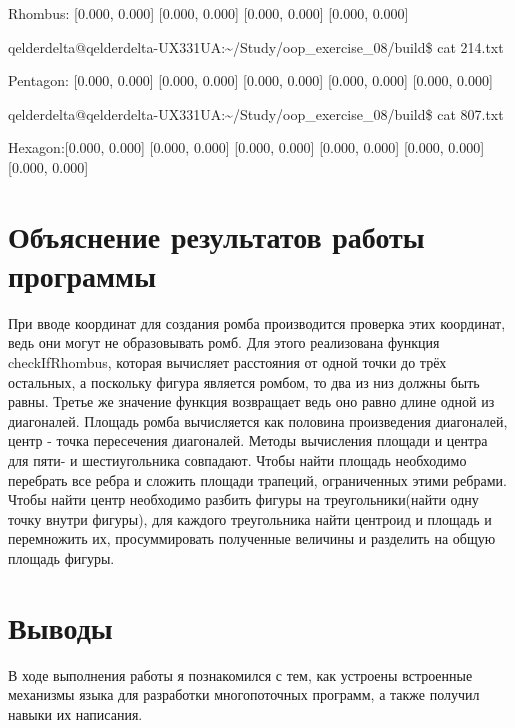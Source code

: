 \documentclass[a4paper, 12pt]{article}
\begin{document}
Rhombus: [0.000, 0.000] [0.000, 0.000] [0.000, 0.000] [0.000, 0.000] 

qelderdelta@qelderdelta-UX331UA:\~{}/Study/oop\_exercise\_08/build\$ cat 214.txt 

Pentagon: [0.000, 0.000] [0.000, 0.000] [0.000, 0.000] [0.000, 0.000] [0.000, 0.000] 

qelderdelta@qelderdelta-UX331UA:\~{}/Study/oop\_exercise\_08/build\$ cat 807.txt 

Hexagon:[0.000, 0.000] [0.000, 0.000] [0.000, 0.000] [0.000, 0.000] [0.000, 0.000] [0.000, 0.000] 
\section{Объяснение результатов работы программы}

При вводе координат для создания ромба производится проверка этих координат, ведь они могут не образовывать ромб. Для этого реализована функция checkIfRhombus, которая вычисляет расстояния от одной точки до трёх остальных, а поскольку фигура является ромбом, то два из низ должны быть равны. Третье же значение функция возвращает ведь оно равно длине одной из диагоналей. Площадь ромба вычисляется как половина произведения диагоналей, центр - точка пересечения диагоналей. Методы вычисления площади и центра для пяти- и шестиугольника совпадают. Чтобы найти площадь необходимо перебрать все ребра и сложить площади трапеций, ограниченных этими ребрами. Чтобы найти центр необходимо разбить фигуры на треугольники(найти одну точку внутри фигуры), для каждого треугольника найти центроид и площадь и перемножить их, просуммировать полученные величины и разделить на общую площадь фигуры.

\newpage
\section{Выводы}

В ходе выполнения работы я познакомился с тем, как устроены встроенные механизмы языка для разработки многопоточных программ, а также получил навыки их написания.
\end{document}
